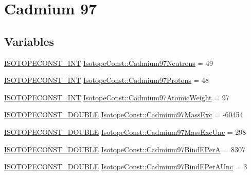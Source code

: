 \hypertarget{group___isotope_const-_cadmium-_cd97}{}\section{Cadmium 97}
\label{group___isotope_const-_cadmium-_cd97}
\subsection*{Variables}
\begin{DoxyCompactItemize}
\item 
\mbox{\hyperlink{group___isotope_const-_macros_ga5f18360b3e99483a35c32d789e62621c}{I\+S\+O\+T\+O\+P\+E\+C\+O\+N\+S\+T\+\_\+\+I\+NT}} \mbox{\hyperlink{group___isotope_const-_cadmium-_cd97_ga2cf5db66dff6446d2d496ff14810aa23}{Isotope\+Const\+::\+Cadmium97\+Neutrons}} = 49
\item 
\mbox{\hyperlink{group___isotope_const-_macros_ga5f18360b3e99483a35c32d789e62621c}{I\+S\+O\+T\+O\+P\+E\+C\+O\+N\+S\+T\+\_\+\+I\+NT}} \mbox{\hyperlink{group___isotope_const-_cadmium-_cd97_gaba6325afff58868bf53444ba74fc63aa}{Isotope\+Const\+::\+Cadmium97\+Protons}} = 48
\item 
\mbox{\hyperlink{group___isotope_const-_macros_ga5f18360b3e99483a35c32d789e62621c}{I\+S\+O\+T\+O\+P\+E\+C\+O\+N\+S\+T\+\_\+\+I\+NT}} \mbox{\hyperlink{group___isotope_const-_cadmium-_cd97_gac46cc65fe0c8d28771a9bfd4dc6d3464}{Isotope\+Const\+::\+Cadmium97\+Atomic\+Weight}} = 97
\item 
\mbox{\hyperlink{group___isotope_const-_macros_ga8f45a7272ce02c0b4c65c44636ed719a}{I\+S\+O\+T\+O\+P\+E\+C\+O\+N\+S\+T\+\_\+\+D\+O\+U\+B\+LE}} \mbox{\hyperlink{group___isotope_const-_cadmium-_cd97_ga0db4dc41562f16f0046d818d516424a1}{Isotope\+Const\+::\+Cadmium97\+Mass\+Exc}} = -\/60454
\item 
\mbox{\hyperlink{group___isotope_const-_macros_ga8f45a7272ce02c0b4c65c44636ed719a}{I\+S\+O\+T\+O\+P\+E\+C\+O\+N\+S\+T\+\_\+\+D\+O\+U\+B\+LE}} \mbox{\hyperlink{group___isotope_const-_cadmium-_cd97_ga51044e94c5524cb530ecd613d4ca068d}{Isotope\+Const\+::\+Cadmium97\+Mass\+Exc\+Unc}} = 298
\item 
\mbox{\hyperlink{group___isotope_const-_macros_ga8f45a7272ce02c0b4c65c44636ed719a}{I\+S\+O\+T\+O\+P\+E\+C\+O\+N\+S\+T\+\_\+\+D\+O\+U\+B\+LE}} \mbox{\hyperlink{group___isotope_const-_cadmium-_cd97_gab2445f8a48d84c194c2565a0bc6d3529}{Isotope\+Const\+::\+Cadmium97\+Bind\+E\+PerA}} = 8307
\item 
\mbox{\hyperlink{group___isotope_const-_macros_ga8f45a7272ce02c0b4c65c44636ed719a}{I\+S\+O\+T\+O\+P\+E\+C\+O\+N\+S\+T\+\_\+\+D\+O\+U\+B\+LE}} \mbox{\hyperlink{group___isotope_const-_cadmium-_cd97_ga5aef53d8892a6171d90fdfe613604cc9}{Isotope\+Const\+::\+Cadmium97\+Bind\+E\+Per\+A\+Unc}} = 3

\end{DoxyCompactItemize}

